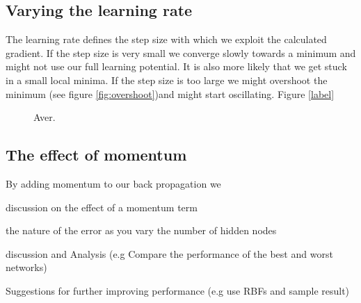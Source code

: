 \documentclass[12pt, a4paper]{article}
\begin{document}
\subsection*{Varying the learning rate}

The learning rate defines the step size with which we exploit the calculated gradient. If the step size is very small we converge slowly towards a minimum and might not use our full learning potential. It is also more likely that we get stuck in a small local minima. If the step size is too large we might overshoot the minimum (see figure \ref{fig:overshoot})and might start oscillating. Figure \ref{label}

\centering
\begin{figure}[htbp]
	\caption{Aver.}
	\label{fig:bad-learning-examples}
\end{figure}


\subsection*{The effect of momentum}

By adding momentum to our back propagation we 


discussion on the effect of a momentum term

the nature of the error as you vary the number of hidden nodes

discussion and Analysis (e.g Compare the performance of the best and worst networks)

Suggestions for further improving performance (e.g use RBFs and sample result)
\end{document}
